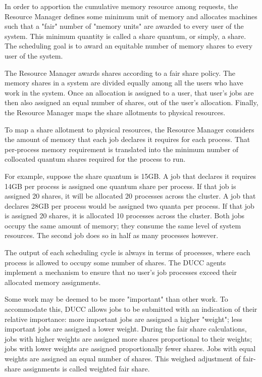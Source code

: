     In order to apportion the cumulative memory resource among requests, the Resource Manager 
    defines some minimum unit of memory and allocates machines such that a "fair" number of 
    "memory units" are awarded to every user of the system. This minimum quantity is called a share 
    quantum, or simply, a share. The scheduling goal is to award an equitable number of memory 
    shares to every user of the system. 

    The Resource Manager awards shares according to a fair share policy. The memory shares in a 
    system are divided equally among all the users who have work in the system. Once an allocation 
    is assigned to a user, that user's jobs are then also assigned an equal number of shares, out of the 
    user's allocation. Finally, the Resource Manager maps the share allotments to physical resources. 
    
    To map a share allotment to physical resources, the Resource Manager considers the amount of 
    memory that each job declares it requires for each process. That per-process memory requirement 
    is translated into the minimum number of collocated quantum shares required for the process to 
    run. 
    
    For example, suppose the share quantum is 15GB. A job that declares it requires 14GB per process 
    is assigned one quantum share per process. If that job is assigned 20 shares, it will be allocated 20 
    processes across the cluster. A job that declares 28GB per process would be assigned two quanta 
    per process. If that job is assigned 20 shares, it is allocated 10 processes across the cluster. Both     
    jobs occupy the same amount of memory; they consume the same level of system resources. The 
    second job does so in half as many processes however. 
    
    The output of each scheduling cycle is always in terms of processes, where each process is allowed 
    to occupy some number of shares. The DUCC agents implement a mechanism to ensure that no 
    user's job processes exceed their allocated memory assignments. 
    
    Some work may be deemed to be more "important" than other work. To accommodate this, DUCC 
    allows jobs to be submitted with an indication of their relative importance: more important jobs are 
    assigned a higher "weight"; less important jobs are assigned a lower weight. During the fair share 
    calculations, jobs with higher weights are assigned more shares proportional to their weights; jobs 
    with lower weights are assigned proportionally fewer shares. Jobs with equal weights are assigned 
    an equal number of shares. This weighed adjustment of fair-share assignments is called weighted 
    fair share. 
    
